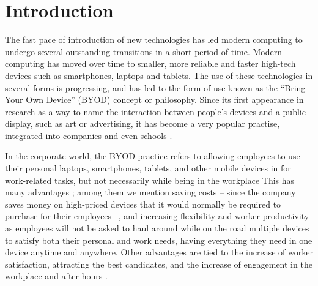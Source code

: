 \documentclass[a4paper,10pt,twocolumn,preprint,3p]{elsarticle}
\begin{document}
\section{Introduction}
\label{sec:intro}

The fast pace of introduction of new technologies has led modern computing to undergo
several outstanding transitions in a short period of time. Modern
computing has moved over time to smaller, more reliable and faster
high-tech devices such as smartphones, laptops and tablets. The use of
these technologies in several forms is progressing, and has led to the
form of use known as the ``Bring Your Own Device'' (BYOD) concept or
philosophy. 
Since its first appearance in research
\cite{ballagas2004byod} as a way to name the interaction between
people's devices and a public display, such as art or advertising, it
has become a very popular practise, integrated into companies
\cite{thomson2012byod} and even schools \cite{song2014bring}.  

In the corporate world, the BYOD
practice refers to allowing employees to use their
personal laptops, smartphones, tablets, and other mobile devices in
for work-related tasks, but not necessarily while being in the workplace This has many
advantages \cite{singh2012byod}; among them we mention saving costs --
since the company saves money on high-priced devices that
it would normally be required to purchase for their employees --, and
increasing flexibility and worker productivity as employees will not
be asked to haul around while on the road multiple devices to satisfy both their personal and
work needs, having everything they need in one device anytime and
anywhere. 
Other advantages are tied to the increase of worker satisfaction, attracting the best candidates, and the increase of engagement in the workplace and after hours \cite{singh2012byod}. 
\end{document}
